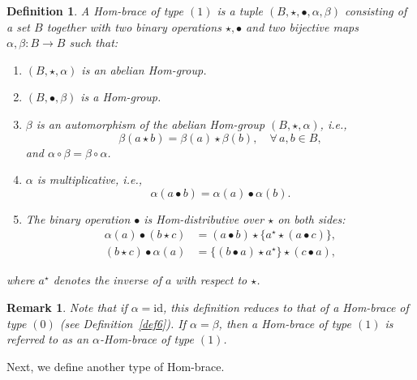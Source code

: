 \documentclass[14pt]{article}
\theoremstyle{Definition}
\newtheorem{Def}[thm]{Definition}
\newtheorem{Rem}[thm]{Remark}
\theoremstyle{remark}
\begin{document}
\begin{Def}
A \emph{Hom-brace of type $(1)$} is a tuple $(B,\star,\bullet,\alpha,\beta)$ consisting of a set $B$ together with two binary operations $\star,\bullet$ and two bijective maps $\alpha,\beta:B\rightarrow B$ such that:
\begin{enumerate}
\item[(i)] $(B,\star,\alpha)$ is an abelian Hom-group.
\item[(ii)] $(B,\bullet,\beta)$ is a Hom-group.
\item[(iii)] $\beta$ is an automorphism of the abelian Hom-group $(B,\star,\alpha)$, i.e.,
$$\beta(a\star b)=\beta(a)\star \beta(b), \quad \forall\, a,b\in B,$$
and $\alpha\circ \beta=\beta\circ\alpha$.
\item[(iv)] $\alpha$ is multiplicative, i.e.,
$$\alpha(a\bullet b)=\alpha(a)\bullet \alpha(b).$$
\item[(v)] The binary operation $\bullet$ is Hom-distributive over $\star$ on both sides:
\begin{align*}
\alpha(a)\bullet(b\star c) &= (a\bullet b)\star \{a^{\star}\star(a\bullet c)\},\\
(b\star c)\bullet\alpha(a) &=\{(b\bullet a)\star a^{\star}\}\star(c\bullet a),
\end{align*}
\end{enumerate}
where $a^{\star}$ denotes the inverse of $a$ with respect to $\star$.
\end{Def}

\begin{Rem}\label{Rem5.4}
Note that if $\alpha=\mathrm{id}$, this definition reduces to that of a Hom-brace of type $(0)$ (see Definition~\ref{def6}).  
If $\alpha=\beta$, then a Hom-brace of type $(1)$ is referred to as an \emph{$\alpha$-Hom-brace of type $(1)$}.
\end{Rem}

Next, we define another type of Hom-brace.  
\end{document}
